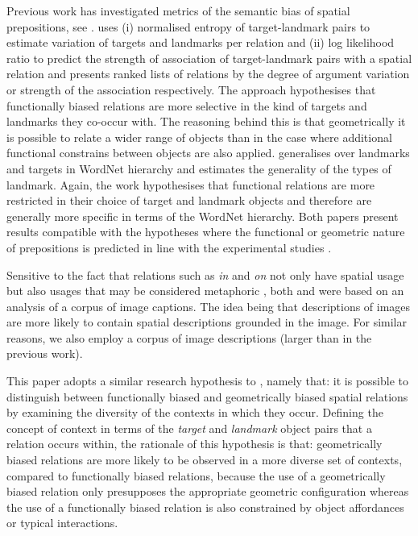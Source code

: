 Previous work has investigated metrics of the semantic bias of spatial prepositions, see \cite{Dobnik:2013aa,Dobnik:2014ab}. \citep{Dobnik:2013aa} uses (i) normalised entropy of target-landmark pairs to estimate variation of targets and landmarks per relation and (ii) log likelihood ratio
to predict the strength of association of target-landmark pairs with a
spatial relation and presents ranked lists of relations by the degree of argument variation or
strength of the association respectively. The approach hypothesises that
functionally biased relations are more selective in the kind of
targets and landmarks they co-occur with. The reasoning behind this is that geometrically it is possible to relate a wider range of objects than in the case where additional functional constrains between objects are also applied. \cite{Dobnik:2014ab}
generalises over landmarks and targets in WordNet hierarchy and
estimates the generality of the types of landmark. Again, the work
hypothesises that functional relations are more restricted in their
choice of target and landmark objects and therefore are generally more
specific in terms of the WordNet hierarchy. Both papers present
results compatible with the hypotheses where the functional or
geometric nature of prepositions is predicted in line with the
experimental studies \cite{Garrod:1999fk,CoventryEtAl:2001}.

Sensitive to the fact that relations such as \emph{in} and \emph{on} not only have spatial usage
but also usages that may be considered metaphoric \cite{Steen:2010aa}, both \cite{Dobnik:2013aa} and \cite{Dobnik:2014ab} were based on an analysis of a corpus of image captions. The idea being that descriptions of images are
more likely to contain spatial descriptions grounded in the image. %
For similar reasons, we also employ a corpus %
of image descriptions (larger than in the previous work).








This paper adopts a similar research hypothesis to
\cite{Dobnik:2014ab,Dobnik:2013aa}, namely that: it is possible to
distinguish between functionally biased and geometrically biased spatial relations by examining the
diversity of the contexts in which they occur. Defining the concept of context in terms
of the \emph{target} and \emph{landmark} object pairs that a relation occurs within, the rationale of this
hypothesis is that: geometrically biased relations are more likely to be observed in a more diverse set of
contexts, compared to functionally biased relations, because the use of a geometrically biased relation
 only presupposes the appropriate geometric configuration whereas the use of a functionally biased
 relation is also constrained by object affordances or typical interactions.


